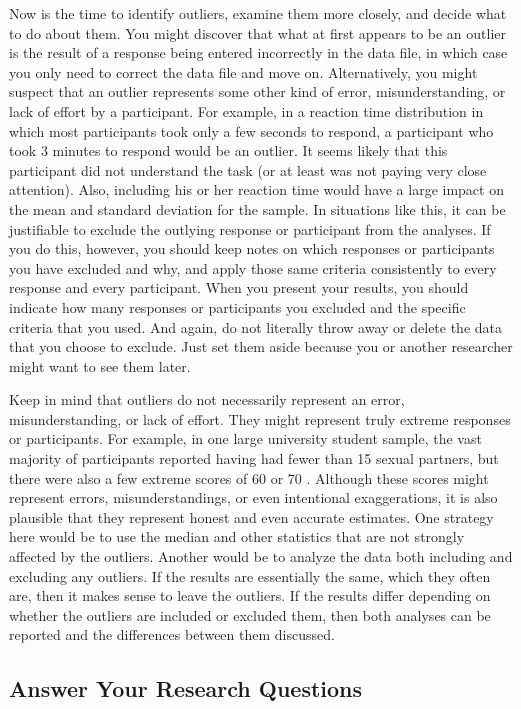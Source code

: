 Now is the time to identify outliers, examine them more closely, and decide what to do about them. You might discover that what at first appears to be an outlier is the result of a response being entered incorrectly in the data file, in which case you only need to correct the data file and move on. Alternatively, you might suspect that an outlier represents some other kind of error, misunderstanding, or lack of effort by a participant. For example, in a reaction time distribution in which most participants took only a few seconds to respond, a participant who took 3 minutes to respond would be an outlier. It seems likely that this participant did not understand the task (or at least was not paying very close attention). Also, including his or her reaction time would have a large impact on the mean and standard deviation for the sample. In situations like this, it can be justifiable to exclude the outlying response or participant from the analyses. If you do this, however, you should keep notes on which responses or participants you have excluded and why, and apply those same criteria consistently to every response and every participant. When you present your results, you should indicate how many responses or participants you excluded and the specific criteria that you used. And again, do not literally throw away or delete the data that you choose to exclude. Just set them aside because you or another researcher might want to see them later.

Keep in mind that outliers do not necessarily represent an error, misunderstanding, or lack of effort. They might represent truly extreme responses or participants. For example, in one large university student sample, the vast majority of participants reported having had fewer than 15 sexual partners, but there were also a few extreme scores of 60 or 70 \citep{brown_estimating_1999}. Although these scores might represent errors, misunderstandings, or even intentional exaggerations, it is also plausible that they represent honest and even accurate estimates. One strategy here would be to use the median and other statistics that are not strongly affected by the outliers. Another would be to analyze the data both including and excluding any outliers. If the results are essentially the same, which they often are, then it makes sense to leave the outliers. If the results differ depending on whether the outliers are included or excluded them, then both analyses can be reported and the differences between them discussed.

\subsection{Answer Your Research Questions}

